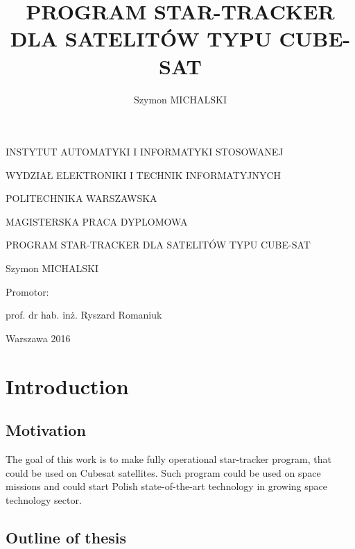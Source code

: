 \documentclass[12pt,a4paper,oneside]{article}
\author{Szymon MICHALSKI}
\title{PROGRAM STAR-TRACKER DLA SATELITÓW TYPU CUBE-SAT}
\begin{document}
\begin{titlepage}
	\centering

	INSTYTUT AUTOMATYKI I INFORMATYKI STOSOWANEJ\par
	WYDZIAŁ ELEKTRONIKI I TECHNIK INFORMATYJNYCH\par
	POLITECHNIKA WARSZAWSKA\par
	\vspace{3cm}
	MAGISTERSKA PRACA DYPLOMOWA\par
	\vspace{0.2cm}
	{\huge PROGRAM STAR-TRACKER DLA SATELITÓW TYPU CUBE-SAT\par}
	\vspace{0.2cm}
	{\large Szymon MICHALSKI\par}
	\vspace{3cm}
	\begin{flushright}
	Promotor:\par
	prof. dr hab. inż. Ryszard Romaniuk\par
	\end{flushright}
	\vfill
	{\large Warszawa 2016\par}
\end{titlepage}

\setcounter{page}{2}


\newpage
\setlength{\parindent}{1cm}
\setlength{\parskip}{\baselineskip}%


\section{Introduction}
\subsection{Motivation}
The goal of this work is to make fully operational star-tracker program, that could be used on Cubesat satellites. Such program could be used on space missions and could start Polish state-of-the-art technology in growing space technology sector.

\subsection{Outline of thesis}
\end{document}
